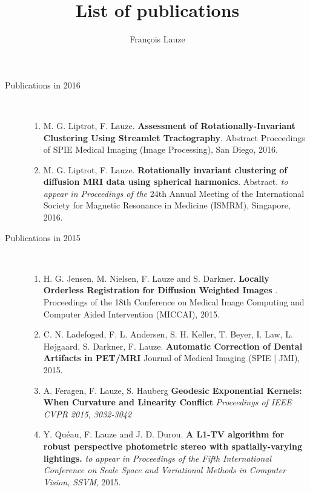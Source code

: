 \documentclass[10pt]{article}
\title{List of publications}
\author{Fran\c{c}ois Lauze}
\begin{document}
\maketitle

\begin{description}
\item[Publications in 2016]~\\

  \begin{enumerate}
  \item M. G. Liptrot, F. Lauze. \textbf{Assessment of Rotationally-Invariant Clustering
      Using Streamlet Tractography}. Abstract Proceedings of SPIE Medical Imaging (Image
    Processing), San Diego, 2016.  
    \item M. G. Liptrot, F. Lauze. \textbf{ Rotationally
      invariant clustering of diffusion MRI data using spherical
      harmonics}. Abstract. \textit{to appear in Proceedings of the} 24th Annual
      Meeting of the International Society for Magnetic Resonance in Medicine (ISMRM),
      Singapore, 2016.  
  \end{enumerate}

\item[Publications in 2015]~\\

  \begin{enumerate}
  \item H. G. Jensen, M. Nielsen, F. Lauze and S. Darkner.  \textbf{Locally Orderless
      Registration for Diffusion Weighted Images }.  Proceedings of the 18th Conference on
    Medical Image Computing and Computer Aided Intervention (MICCAI), 2015.

  \item C. N. Ladefoged, F. L. Andersen, S. H. Keller, T. Beyer, I. Law, L. H{\o}jgaard,
    S. Darkner, F. Lauze.  \textbf{ Automatic Correction of Dental Artifacts in PET/MRI }
    Journal of Medical Imaging (SPIE | JMI), 2015.

  \item A. Feragen, F. Lauze, S. Hauberg \textbf{ Geodesic Exponential Kernels: When
      Curvature and Linearity Conflict } \textit{Proceedings of IEEE CVPR 2015, 3032-3042}

  \item Y. Qu{\'e}au, F. Lauze and J. D. Durou.  \textbf{ A L1-TV algorithm for robust
      perspective photometric stereo with spatially-varying lightings.  } \textit{ to
      appear in Proceedings of the Fifth International Conference on Scale Space and
      Variational Methods in Computer Vision, SSVM}, 2015.


\end{enumerate}
\end{description}
\end{document}
